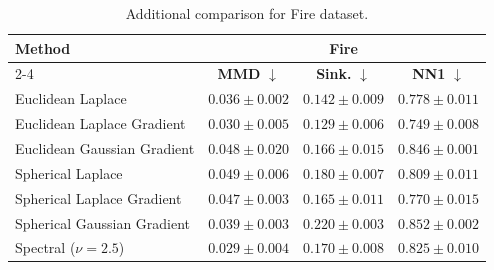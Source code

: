 \documentclass{article}
\theoremstyle{plain}
\newcommand{\best}[1]{\cellcolor{bestblue}#1}
\newcommand{\second}[1]{\cellcolor{secondblue}#1}
\newcommand{\third}[1]{\cellcolor{thirdgrayblue}#1}
\begin{document}
\begin{table}[h!]
\centering
\small
\setlength{\tabcolsep}{6pt}
\renewcommand{\arraystretch}{1.15}
\begin{tabular}{lccc}
\toprule
\textbf{Method} 
& \multicolumn{3}{c}{\textbf{Fire}} \\
\cmidrule(lr){2-4} 
& \textbf{MMD} $\downarrow$ & \textbf{Sink.} $\downarrow$ & \textbf{NN1} $\downarrow$\\
\midrule
Euclidean Laplace {\tiny \cite{Deng_2026_Drift}}
& \third{$0.036 \pm 0.002$} & \second{$0.142 \pm 0.009$} & \third{$0.778 \pm 0.011$} \\
\midrule
Euclidean Laplace Gradient
& \second{$0.030 \pm 0.005$} & \best{$0.129 \pm 0.006$} & \best{$0.749 \pm 0.008$} \\
Euclidean Gaussian Gradient
& $0.048 \pm 0.020$ & {$0.166 \pm 0.015$} & $0.846 \pm 0.001$ \\
Spherical Laplace
& $0.049 \pm 0.006$ & $0.180 \pm 0.007$ & $0.809 \pm 0.011$ \\
Spherical Laplace Gradient
& $0.047 \pm 0.003$ & \third{$0.165 \pm 0.011$} & \second{$0.770 \pm 0.015$} \\
Spherical Gaussian Gradient
& $0.039 \pm 0.003$ & $0.220 \pm 0.003$ & $0.852 \pm 0.002$ \\
Spectral ($\nu = 2.5$)
& \best{$0.029 \pm 0.004$} & $0.170 \pm 0.008$ & $0.825 \pm 0.010$ \\
\bottomrule
\end{tabular}
\caption{Additional comparison for Fire dataset.
}
\label{tab:fire-full}
\end{table}
\end{document}
